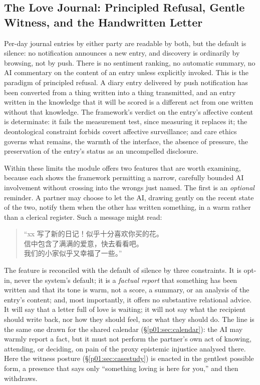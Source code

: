 \subsection{The Love Journal: Principled Refusal, Gentle Witness, and the Handwritten Letter}\label{p01:sec:diary}

Per-day journal entries by either party are readable by both, but the default is silence: no notification announces a new entry, and discovery is ordinarily by browsing, not by push. There is no sentiment ranking, no automatic summary, no AI commentary on the content of an entry unless explicitly invoked. This is the paradigm of principled refusal. A diary entry delivered by push notification has been converted from a thing written into a thing transmitted, and an entry written in the knowledge that it will be scored is a different act from one written without that knowledge. The framework's verdict on the entry's affective content is determinate: it fails the measurement test, since measuring it replaces it; the deontological constraint forbids covert affective surveillance; and care ethics governs what remains, the warmth of the interface, the absence of pressure, the preservation of the entry's status as an uncompelled disclosure.

Within these limits the module offers two features that are worth examining, because each shows the framework permitting a narrow, carefully bounded AI involvement without crossing into the wrongs just named. The first is an \emph{optional} reminder. A partner may choose to let the AI, drawing gently on the recent state of the two, notify them when the other has written something, in a warm rather than a clerical register. Such a message might read: \begin{quote}\small\cjkfont\color{ink}\raggedright ``xx 写了新的日记！似乎十分喜欢你买的花。\\信中包含了满满的爱意，快去看看吧。\\我们的小家似乎又幸福了一些。''\end{quote} The feature is reconciled with the default of silence by three constraints. It is opt-in, never the system's default; it is a \emph{factual report} that something has been written and that its tone is warm, not a score, a summary, or an analysis of the entry's content; and, most importantly, it offers no substantive relational advice. It will say that a letter full of love is waiting; it will not say what the recipient should write back, nor how they should feel, nor what they should do. The line is the same one drawn for the shared calendar (§\ref{p01:sec:calendar}): the AI may warmly report a fact, but it must not perform the partner's own act of knowing, attending, or deciding, on pain of the proxy epistemic injustice analysed there. Here the witness posture (§\ref{p01:sec:casestudy}) is enacted in the gentlest possible form, a presence that says only ``something loving is here for you,'' and then withdraws.

